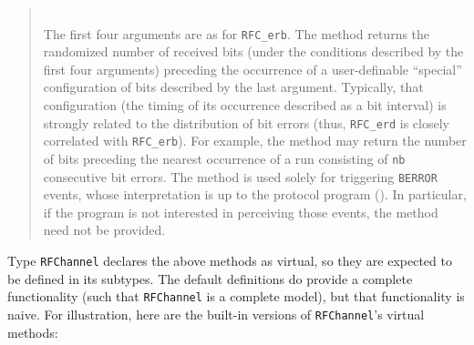 \begin{quote}
\noindent{} \hspace{0in}\vspace{0.05in}\\
\noindent
The first four arguments are as for {\tt RFC\_erb}.
The method returns the randomized number of received
bits (under the conditions described by the first four arguments)
preceding the occurrence of a user-definable ``special''
configuration of bits described by the last argument.
Typically, that configuration
(the timing of its occurrence described as a bit interval)
is strongly related to the distribution of
bit errors (thus, {\tt RFC\_erd} is closely correlated with {\tt RFC\_erb}).
For example, the method may
return the number of bits preceding the nearest occurrence of a run consisting
of {\tt nb} consecutive bit errors.
The method is used solely
for triggering {\tt BERROR} events, whose interpretation
is up to the protocol program ().
In particular, if the program is not interested in perceiving those events,
the method need not be provided.
\end{quote}

Type {\tt RFChannel} declares the above methods as virtual, so they are
expected to be defined in its subtypes.
The default definitions do provide a complete functionality (such that
{\tt RFChannel} is a complete model), but that functionality is naive.
For illustration, here are the built-in versions of {\tt RFChannel}'s
virtual methods:

